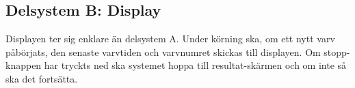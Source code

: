   \subsection{Delsystem B: Display}

  Displayen ter sig enklare än delsystem A. Under körning ska, om ett nytt varv
  påbörjats, den senaste varvtiden och varvnumret skickas till displayen. Om
  stopp-knappen har tryckts ned ska systemet hoppa till resultat-skärmen och om
  inte så ska det fortsätta.

